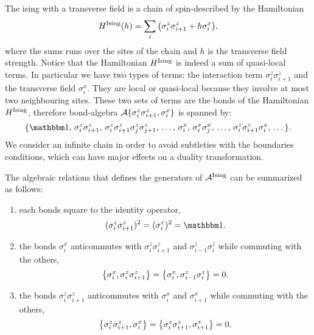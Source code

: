 The \acl{ising} with a transverse field is a chain of spin-\onehalf described by the Hamiltonian
\begin{equation}
    H^{\text{Ising}}(h) = \sum_{i} \qty( \sigma^z_i \sigma^z_{i+1} + h \sigma^x_i ),
    \label{eq:hamiltonian_ising}
\end{equation}
where the sums runs over the sites of the chain and $h$ is the transverse field strength.
Notice that the Hamiltonian $H^{\text{Ising}}$ is indeed a sum of quasi-local terms.
In particular we have two types of terms: the interaction term $\sigma^z_i \sigma^z_{i+1}$ and the transverse field $\sigma^x_i$.
They are local or quasi-local because they involve at most two neighbouring sites.
These two sets of terms are the bonds of the Hamiltonian $H^{\text{Ising}}$, therefore bond-algebra $\mathcal{A} \{\sigma^z_i \sigma^z_{i+1}, \sigma^x_i\}$ is spanned by:
\begin{equation*}
    \{
        \identity, \,
        \sigma^z_i \sigma^z_{i+1}, \,
        \sigma^z_i \sigma^z_{i+1} \sigma^z_j \sigma^z_{j+1}, \,
        \dots, \,
        \sigma^x_i, \,
        \sigma^x_i \sigma^x_j, \,
        \dots, \,
        \sigma^z_i \sigma^z_{i+1} \sigma^x_i, \,
        \dots
    \}.
\end{equation*}
We consider an infinite chain in order to avoid subtleties with the boundaries conditions, which can have major effects on a duality transformation.

The algebraic relations that defines the generators of $\mathcal{A}^{\text{Ising}}$ can be summarized as follows:
\begin{enumerate}
    \item each bonds square to the identity operator,
        \begin{equation*}
            (\sigma^z_i \sigma^z_{i+1})^2 = (\sigma^x_i)^2 = \identity.
        \end{equation*}

    \item the bonds $\sigma_i^x$ anticommutes with $\sigma^z_i \sigma^z_{i+1}$ and $\sigma^z_{i-1} \sigma^z_i$ while commuting with the others,
        \begin{equation*}
            \acomm{\sigma_i^x}{\sigma^z_i \sigma^z_{i+1}} =
            \acomm{\sigma_i^x}{\sigma^z_{i-1} \sigma^z_i} = 0.
        \end{equation*}


    \item the bonds $\sigma^z_i \sigma^z_{i+1}$ anticommutes with $\sigma^x_i$ and $\sigma^x_{i+1}$ while commuting with the others,
        \begin{equation*}
            \acomm{\sigma^z_i \sigma^z_{i+1}}{\sigma^x_i} =
            \acomm{\sigma^z_i \sigma^z_{i+1}}{\sigma^x_{i+1}} = 0.
        \end{equation*}
\end{enumerate}

